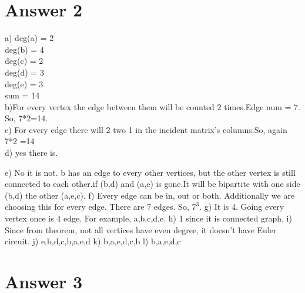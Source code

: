 \documentclass[12pt]{article}
\begin{document}
\section*{Answer 2}
a) deg(a) = 2 \\ deg(b) = 4 \\ deg(c) = 2\\  deg(d) = 3 \\ deg(e) = 3 \\ sum = 14 \\
b)For every vertex the edge between them will be counted 2 times.Edge num = 7. So, 7*2=14.\\
c) For every edge there will 2 two 1 in the incident matrix's columns.So, again 7*2 =14 \\
d) yes there is.
\begin{figure}[H]
	\centering
\end{figure}
e) No it is not. b has an edge to every other vertices, but the other vertex is still connected to each other.if (b,d) and (a,e) is gone.It will be bipartite with one side (b,d) the other (a,e,c). \newline
f) Every edge can be in, out or both. Additionally we are choosing this for every edge. There are 7 edges. So, $7^3$. \newline
g) It is 4. Going every vertex once is 4 edge. For example, a,b,c,d,e.\newline
h) 1 since it is connected graph.\newline
i) Since from theorem, not all vertices have even degree, it doesn't have Euler circuit.\newline
j) e,b,d,c,b,a,e,d\newline
k) b,a,e,d,c,b\newline
l) b,a,e,d,c\newline


\section*{Answer 3}
\end{document}
